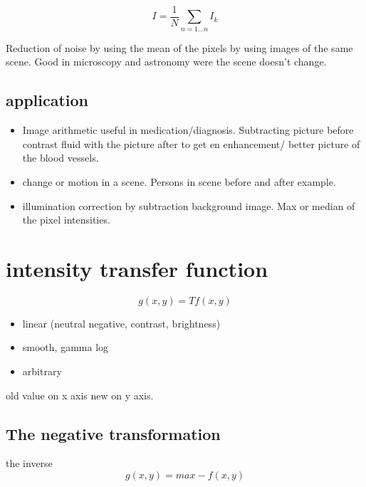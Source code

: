 \begin{equation}
I =  \frac{1} {N} \sum_{n=1 \ldots n }I_k
\end{equation}

Reduction of noise by using the mean of the pixels by using images of the same scene. Good in microscopy and astronomy were the scene doesn't change. 

\subsection*{application}

\begin{itemize}
    \item Image arithmetic useful in medication/diagnosis. Subtracting picture before contrast fluid with the picture after to get en enhancement/ better picture of the blood vessels. 
    \item change or motion in a scene. Persons in scene before and after example. 
    \item illumination correction by subtraction background image. Max or median of the pixel intensities. 
\end{itemize}


\section{intensity transfer function}

\begin{equation}
g(x,y) = Tf(x,y)
\end{equation}

\begin{itemize}
    \item linear (neutral negative, contrast, brightness)
    \item smooth, gamma log
    \item arbitrary
\end{itemize}

old value on x axis new on y axis.

\subsection*{The negative transformation}
the inverse 
\begin{equation}
g(x,y) = max - f(x,y)
\end{equation}


